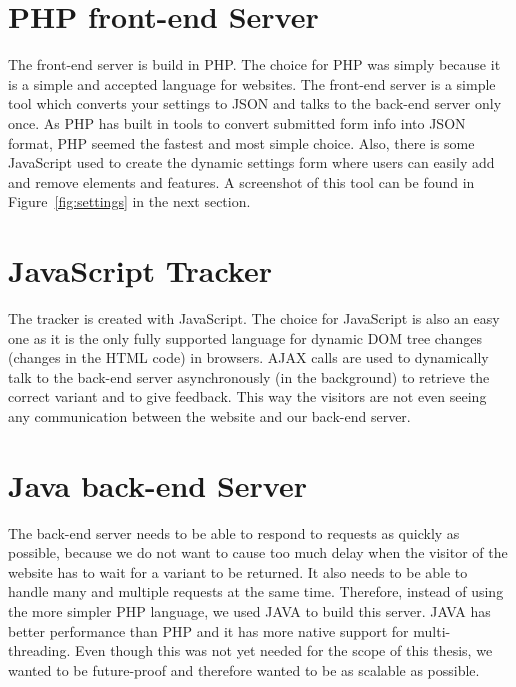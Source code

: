 \documentclass{report}
\begin{document}
\section{PHP front-end Server}
The front-end server is build in PHP. The choice for PHP was simply because it is a simple and accepted language for websites. The front-end server is a simple tool which converts your settings to JSON and talks to the back-end server only once. As PHP has built in tools to convert submitted form info into JSON format, PHP seemed the fastest and most simple choice.
Also, there is some JavaScript used to create the dynamic settings form where users can easily add and remove elements and features. A screenshot of this tool can be found in Figure~\ref{fig:settings} in the next section.

\section{JavaScript Tracker}
The tracker is created with JavaScript. The choice for JavaScript is also an easy one as it is the only fully supported language for dynamic DOM tree changes (changes in the HTML code) in browsers. AJAX calls are used to dynamically talk to the back-end server asynchronously (in the background) to retrieve the correct variant and to give feedback. This way the visitors are not even seeing any communication between the website and our back-end server.

\section{Java back-end Server}
The back-end server needs to be able to respond to requests as quickly as possible, because we do not want to cause too much delay when the visitor of the website has to wait for a variant to be returned. It also needs to be able to handle many and multiple requests at the same time. Therefore, instead of using the more simpler PHP language, we used JAVA to build this server. JAVA has better performance than PHP and it has more native support for multi-threading. Even though this was not yet needed for the scope of this thesis, we wanted to be future-proof and therefore wanted to be as scalable as possible. 
\end{document}
